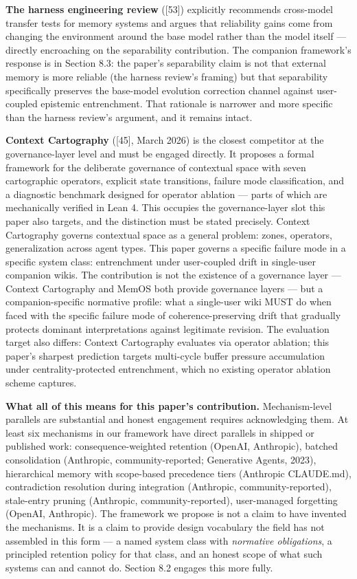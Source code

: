 \documentclass[
  11pt,
]{article}
\begin{document}
\textbf{The harness engineering review} ({[}53{]}) explicitly recommends
cross-model transfer tests for memory systems and argues that
reliability gains come from changing the environment around the base
model rather than the model itself --- directly encroaching on the
separability contribution. The companion framework's response is in
Section 8.3: the paper's separability claim is not that external memory
is more reliable (the harness review's framing) but that separability
specifically preserves the base-model evolution correction channel
against user-coupled epistemic entrenchment. That rationale is narrower
and more specific than the harness review's argument, and it remains
intact.

\textbf{Context Cartography} ({[}45{]}, March 2026) is the closest
competitor at the governance-layer level and must be engaged directly.
It proposes a formal framework for the deliberate governance of
contextual space with seven cartographic operators, explicit state
transitions, failure mode classification, and a diagnostic benchmark
designed for operator ablation --- parts of which are mechanically
verified in Lean 4. This occupies the governance-layer slot this paper
also targets, and the distinction must be stated precisely. Context
Cartography governs contextual space as a general problem: zones,
operators, generalization across agent types. This paper governs a
specific failure mode in a specific system class: entrenchment under
user-coupled drift in single-user companion wikis. The contribution is
not the existence of a governance layer --- Context Cartography and
MemOS both provide governance layers --- but a companion-specific
normative profile: what a single-user wiki MUST do when faced with the
specific failure mode of coherence-preserving drift that gradually
protects dominant interpretations against legitimate revision. The
evaluation target also differs: Context Cartography evaluates via
operator ablation; this paper's sharpest prediction targets multi-cycle
buffer pressure accumulation under centrality-protected entrenchment,
which no existing operator ablation scheme captures.

\textbf{What all of this means for this paper's contribution.}
Mechanism-level parallels are substantial and honest engagement requires
acknowledging them. At least six mechanisms in our framework have direct
parallels in shipped or published work: consequence-weighted retention
(OpenAI, Anthropic), batched consolidation (Anthropic,
community-reported; Generative Agents, 2023), hierarchical memory with
scope-based precedence tiers (Anthropic CLAUDE.md), contradiction
resolution during integration (Anthropic, community-reported),
stale-entry pruning (Anthropic, community-reported), user-managed
forgetting (OpenAI, Anthropic). The framework we propose is not a claim
to have invented the mechanisms. It is a claim to provide design
vocabulary the field has not assembled in this form --- a named system
class with \emph{normative obligations}, a principled retention policy
for that class, and an honest scope of what such systems can and cannot
do. Section 8.2 engages this more fully.
\end{document}
